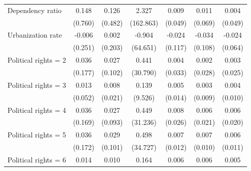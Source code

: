 \begin{table}[htbp]
\begin{tabular}{lcccccc}
      Dependency ratio           & 0.148                                & 0.126                              & 2.327       & 0.009       & 0.011       & 0.004\\   
                                 & (0.760)                              & (0.482)                            & (162.863)   & (0.049)     & (0.069)     & (0.049)\\   
      Urbanization rate          & -0.006                               & 0.002                              & -0.904      & -0.024      & -0.034      & -0.024\\   
                                 & (0.251)                              & (0.203)                            & (64.651)    & (0.117)     & (0.108)     & (0.064)\\   
      Political rights = 2       & 0.036                                & 0.027                              & 0.441       & 0.004       & 0.002       & 0.003\\   
                                 & (0.177)                              & (0.102)                            & (30.790)    & (0.033)     & (0.028)     & (0.025)\\   
      Political rights = 3       & 0.013                                & 0.008                              & 0.139       & 0.005       & 0.003       & 0.004\\   
                                 & (0.052)                              & (0.021)                            & (9.526)     & (0.014)     & (0.009)     & (0.010)\\   
      Political rights = 4       & 0.036                                & 0.027                              & 0.449       & 0.008       & 0.006       & 0.006\\   
                                 & (0.169)                              & (0.093)                            & (31.236)    & (0.026)     & (0.021)     & (0.020)\\   
      Political rights = 5       & 0.036                                & 0.029                              & 0.498       & 0.007       & 0.007       & 0.006\\   
                                 & (0.172)                              & (0.101)                            & (34.727)    & (0.012)     & (0.010)     & (0.011)\\   
      Political rights = 6       & 0.014                                & 0.010                              & 0.164       & 0.006       & 0.006       & 0.005\\   

\end{tabular}
\end{table}
